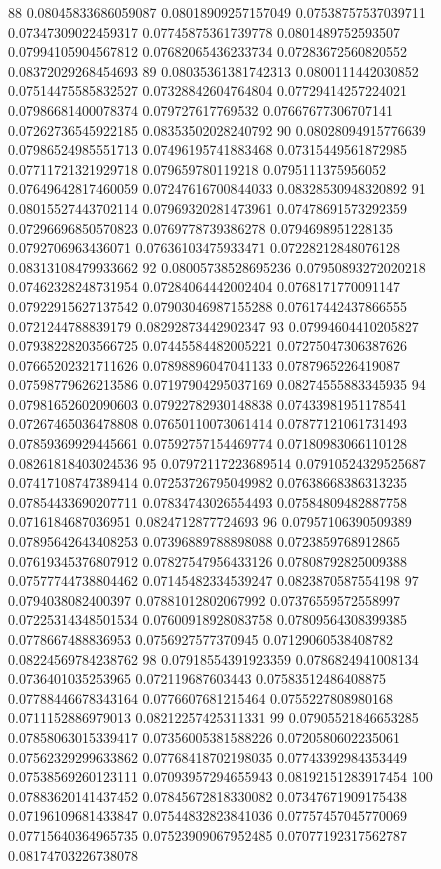 88 0.08045833686059087 0.08018909257157049 0.07538757537039711 0.07347309022459317 0.07745875361739778 0.0801489752593507 0.07994105904567812 0.07682065436233734 0.07283672560820552 0.08372029268454693
89 0.08035361381742313 0.0800111442030852 0.07514475585832527 0.07328842604764804 0.07729414257224021 0.07986681400078374 0.079727617769532 0.07667677306707141 0.07262736545922185 0.08353502028240792
90 0.08028094915776639 0.07986524985551713 0.07496195741883468 0.07315449561872985 0.07711721321929718 0.079659780119218 0.0795111375956052 0.07649642817460059 0.07247616700844033 0.08328530948320892
91 0.08015527443702114 0.07969320281473961 0.07478691573292359 0.07296696850570823 0.0769778739386278 0.0794698951228135 0.0792706963436071 0.07636103475933471 0.07228212848076128 0.08313108479933662
92 0.08005738528695236 0.07950893272020218 0.07462328248731954 0.07284064442002404 0.0768171770091147 0.07922915627137542 0.07903046987155288 0.07617442437866555 0.0721244788839179 0.08292873442902347
93 0.07994604410205827 0.07938228203566725 0.07445584482005221 0.07275047306387626 0.07665202321711626 0.07898896047041133 0.0787965226419087 0.07598779626213586 0.07197904295037169 0.08274555883345935
94 0.07981652602090603 0.07922782930148838 0.07433981951178541 0.07267465036478808 0.07650110073061414 0.07877121061731493 0.07859369929445661 0.07592757154469774 0.07180983066110128 0.08261818403024536
95 0.07972117223689514 0.07910524329525687 0.07417108747389414 0.07253726795049982 0.07638668386313235 0.07854433690207711 0.07834743026554493 0.07584809482887758 0.0716184687036951 0.0824712877724693
96 0.07957106390509389 0.07895642643408253 0.07396889788898088 0.0723859768912865 0.07619345376807912 0.07827547956433126 0.07808792825009388 0.07577744738804462 0.07145482334539247 0.0823870587554198
97 0.0794038082400397 0.07881012802067992 0.07376559572558997 0.07225314348501534 0.07600918928083758 0.07809564308399385 0.0778667488836953 0.0756927577370945 0.07129060538408782 0.08224569784238762
98 0.07918554391923359 0.0786824941008134 0.0736401035253965 0.072119687603443 0.07583512486408875 0.07788446678343164 0.0776607681215464 0.0755227808980168 0.0711152886979013 0.08212257425311331
99 0.07905521846653285 0.07858063015339417 0.07356005381588226 0.0720580602235061 0.07562329299633862 0.07768418702198035 0.07743392984353449 0.07538569260123111 0.07093957294655943 0.08192151283917454
100 0.07883620141437452 0.07845672818330082 0.07347671909175438 0.07196109681433847 0.07544832823841036 0.07757457045770069 0.07715640364965735 0.07523909067952485 0.07077192317562787 0.08174703226738078

